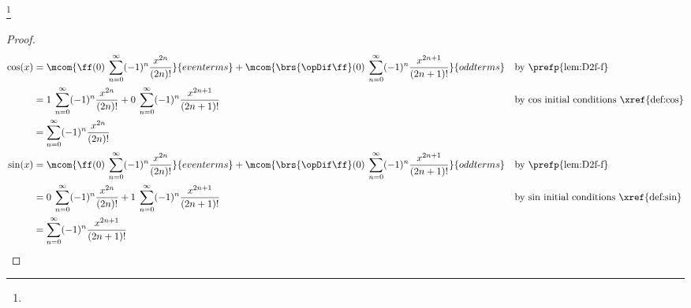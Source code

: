 \begin{theorem}
\footnote{
  }
\label{thm:cos_taylor}
\label{thm:sin_taylor}
\end{theorem}
\begin{proof}
\begin{align*}
  \cos(x)
    &= \mcom{\ff(0)\:\sum_{n=0}^\infty (-1)^n \frac{x^{2n}}{(2n)!}     }{even terms}
     + \mcom{\brs{\opDif\ff}(0)\:\sum_{n=0}^\infty (-1)^n \frac{x^{2n+1}}{(2n+1)!} }{odd terms}
    && \text{by \prefp{lem:D2f-f}}
  \\&= 1\:\sum_{n=0}^\infty (-1)^n \frac{x^{2n}}{(2n)!}
     + 0\:\sum_{n=0}^\infty (-1)^n \frac{x^{2n+1}}{(2n+1)!}
    && \text{by $\cos$ initial conditions \xref{def:cos}}
  \\&= \sum_{n=0}^\infty (-1)^n \frac{x^{2n}}{(2n)!}
  \\
  \sin(x)
    &= \mcom{\ff(0)\:\sum_{n=0}^\infty (-1)^n \frac{x^{2n}}{(2n)!}     }{even terms}
     + \mcom{\brs{\opDif\ff}(0)\:\sum_{n=0}^\infty (-1)^n \frac{x^{2n+1}}{(2n+1)!} }{odd terms}
    && \text{by \prefp{lem:D2f-f}}
  \\&= 0\:\sum_{n=0}^\infty (-1)^n \frac{x^{2n}}{(2n)!}
     + 1\:\sum_{n=0}^\infty (-1)^n \frac{x^{2n+1}}{(2n+1)!}
    && \text{by $\sin$ initial conditions \xref{def:sin}}
  \\&= \sum_{n=0}^\infty (-1)^n \frac{x^{2n+1}}{(2n+1)!}
\end{align*}
\end{proof}


